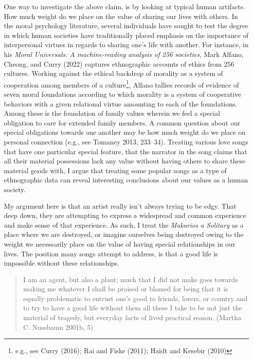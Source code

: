 \documentclass[12pt]{book}
\theoremstyle{definition}
\theoremstyle{remark}
\begin{document}
One way to investigate the above claim, is by looking at typical human artifacts. How much weight do we place on the value of sharing our lives with others. In the moral psychology literature, several individuals have sought to test the degree in which human societies have traditionally placed emphasis on the importance of interpersonal virtues in regards to sharing one's life with another. For instance, in his \emph{Moral Universals: A machine-reading analysis of 256 societies}, Mark Alfano, Cheong, and Curry (2022) captures ethnographic accounts of ethics from 256 cultures. Working against the ethical backdrop of morality as a system of cooperation among members of a culture\footnote{e.g., see Curry (2016); Rai and Fiske (2011); Haidt and Kesebir (2010)}, Alfano tallies records of evidence of seven moral foundations according to which morality is a system of cooperative behaviors with a given relational virtue amounting to each of the foundations. Among these is the foundation of family values wherein we feel a special obligation to care for extended family members. A common question about our special obligations towards one another may be how much weight do we place on personal connection (e.g., see Tomaney 2013, 233--34). Treating various love songs that have one particular special feature, that the narrator in the song claims that all their material possessions lack any value without having others to share these material goods with, I argue that treating some popular songs as a type of ethnographic data can reveal interesting conclusions about our values as a human society.

My argument here is that an artist really isn't always trying to be edgy. That deep down, they are attempting to express a widespread and common experience and make sense of that experience. As such, I treat the \emph{Makarios a Solitary} as a place where we are destroyed, or imagine ourselves being destroyed owing to the weight we necessarily place on the value of having special relationships in our lives. The position many songs attempt to address, is that a good life is impossible without these relationships.

\begin{quote}
I am an agent, but also a plant; much that I did not make goes towards making me whatever I shall be praised or blamed for being that it is equally problematic to entrust one's good to friends, lovers, or country and to try to have a good life without them all these I take to be not just the material of tragedy, but everyday facts of lived practical reason. (Martha C. Nussbaum 2001b, 5)
\end{quote}
\end{document}
